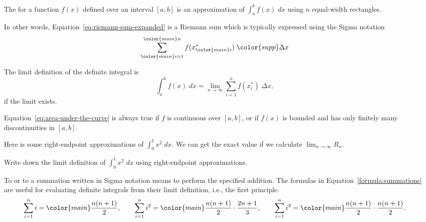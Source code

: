 \documentclass[../main.tex]{subfiles}
\begin{document}
\begin{definition} \label{def:riemann-sum}
  The  for a function \(f(x)\) defined over an interval \([a,b]\) is an approximation of \(\int_{a}^{b} f(x) \;dx\) using \(n\) equal-width rectangles. 

  In other words, Equation~\eqref{eq:riemann-sum-expanded} is a Riemann sum which is typically expressed using the Sigma notation
  \begin{equation} \label{eq:riemann-sum}
    \sum_{{\color{main}i}=1}^{{\color{main}n}} f(x_{{\color{main}i}}^{*}) \; {\color{supp} \Delta x} 
  \end{equation}

  \faStar{} The limit definition of the definite integral is
  \begin{equation} \label{eq:area-under-the-curve}
    \int_{a}^{b} f(x) \;dx = \lim_{n \to \infty} \sum_{i=1}^{n} f(x_{i}^{*}) \; \Delta x,
  \end{equation}
  if the limit exists.

  Equation~\eqref{eq:area-under-the-curve} is always true if \(f\) is continuous over \([a,b]\), or if \(f(x)\) is bounded and has only finitely many discontinuities in \([a,b]\).

\end{definition}

Here is some right-endpoint approximations of \(\int_{0}^{1} x^{2} \;dx\). We can get the exact value if we calculate \(\lim_{n \to \infty} R_{n}\).

\begin{center}
  \quad
  \quad
  \quad
  
\end{center}

\begin{example}
  Write down the limit definition of \(\int_{0}^{1} x^{2} \;dx\) using right-endpoint approximations.

  \blanks*
\end{example}
\clearpage

To  or to  a summation written in Sigma notation means to perform the specified addition.  The formulas in Equation~\eqref{formula:summations} are useful for evaluating definite integrals from their limit definition, i.e., the first principle.
\begin{equation} \label{formula:summations}
  \sum_{i=1}^{n} i = {\color{main} \frac{n(n+1)}{2}}, \qquad \sum_{i=1}^{n} i^{2} = {\color{main}\frac{n(n+1)}{2}} \cdot \frac{2n+1}{3}, \qquad \sum_{i=1}^{n} i^{3} = {\color{main}\frac{n(n+1)}{2}} \cdot \frac{n(n+1)}{2}.
\end{equation}
\end{document}
